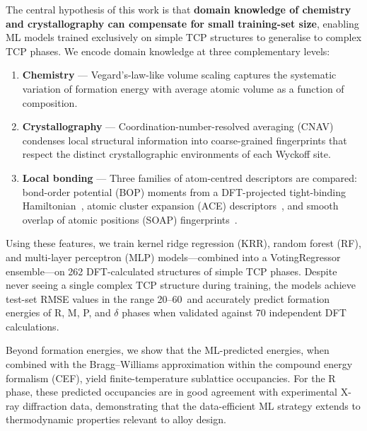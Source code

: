 The central hypothesis of this work is that \textbf{domain knowledge of chemistry and crystallography can compensate for small training-set size}, enabling ML models trained exclusively on simple TCP structures to generalise to complex TCP phases. We encode domain knowledge at three complementary levels:

\begin{enumerate}
  \item \textbf{Chemistry} --- Vegard's-law-like volume scaling captures the systematic variation of formation energy with average atomic volume as a function of composition.
  \item \textbf{Crystallography} --- Coordination-number-resolved averaging (CNAV) condenses local structural information into coarse-grained fingerprints that respect the distinct crystallographic environments of each Wyckoff site.
  \item \textbf{Local bonding} --- Three families of atom-centred descriptors are compared: bond-order potential (BOP) moments from a DFT-projected tight-binding Hamiltonian~\cite{bopfox,hammerschmidt_2008,hammerschmidt_2013}, atomic cluster expansion (ACE) descriptors~\cite{ace}, and smooth overlap of atomic positions (SOAP) fingerprints~\cite{soap}.
\end{enumerate}

Using these features, we train kernel ridge regression (KRR), random forest (RF), and multi-layer perceptron (MLP) models---combined into a VotingRegressor ensemble---on 262 DFT-calculated structures of simple TCP phases. Despite never seeing a single complex TCP structure during training, the models achieve test-set RMSE values in the range 20--60~\meVat and accurately predict formation energies of R, M, P, and $\delta$ phases when validated against 70 independent DFT calculations.

Beyond formation energies, we show that the ML-predicted energies, when combined with the Bragg--Williams approximation within the compound energy formalism (CEF), yield finite-temperature sublattice occupancies. For the R phase, these predicted occupancies are in good agreement with experimental X-ray diffraction data, demonstrating that the data-efficient ML strategy extends to thermodynamic properties relevant to alloy design.
